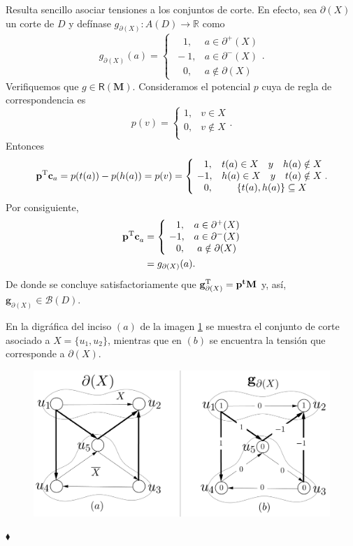 Resulta sencillo asociar tensiones a los conjuntos de corte. En efecto, sea $\partial(X)$ un corte de $D$ y defínase $g_{\partial(X)}\colon A(D) \rightarrow \mathbb{R}$ como 
$$
g_{\partial(X)}(a) = \left\{\begin{matrix}
\quad1, & a \in \partial^{+}(X)\\ 
\ -1, & a \in \partial^{-}(X)\\
\quad 0, & a \notin \partial(X) 
\end{matrix}\right..
$$
Verifiquemos que $g\in \mathsf{R}(\mathbf{M})$. Consideramos el potencial $p$ cuya de regla de correspondencia es
$$
p(v) = \left\{\begin{matrix}
1, & v \in X\\ 
0, & v \notin X\\
\end{matrix}\right..
$$
Entonces 
$$
\mathbf{p}^{\textnormal{T}}\mathbf{c}_{a} = p(t(a)) - p(h(a)) = p(v) =
\left\{\begin{matrix}
\quad 1, & t(a) \in X \quad y \quad h(a) \notin X \\ 
\ -1, & h(a) \in X \quad y \quad t(a) \notin X\\
\quad 0, & \{t(a), h(a)\} \subseteq X
\end{matrix}\right..
$$
Por consiguiente,
\begin{align*}
\mathbf{p^{\textnormal{T}}\mathbf{c}}_{a} &= \left\{\begin{matrix}
\quad1, & a \in \partial^{+}(X)\\ 
\ -1, & a \in \partial^{-}(X)\\
\quad 0, & a \notin \partial(X) 
\end{matrix}\right. 
\\ &= g_{\partial(X)}(a).
\end{align*}
De donde se concluye satisfactoriamente que $\mathbf{g}^{\textnormal{T}}_{\partial(X)} = \mathbf{p^{t}M}$ y, así, $\mathbf{g}_{\partial(X)} \in \mathcal{B}(D)$. 

\begin{ejem}
En la digráfica del inciso $(a)$ de la imagen \ref{fig:tensionesycortes} se muestra el conjunto de corte asociado a $X=\{u_{1},u_{2}\}$, mientras que en $(b)$ se encuentra la tensión que corresponde a $\partial(X)$.

\begin{figure}[H]
    \centering
    \includegraphics[scale = 0.2]{img/imgchapter2/tensionesycortes.jpg}
    \caption{}
    \label{fig:tensionesycortes}
\end{figure}
\hfill $\blacklozenge$
\end{ejem}

